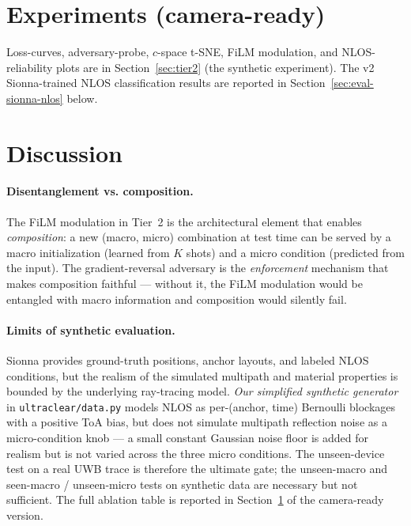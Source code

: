 \documentclass[11pt,letterpaper]{article}
\begin{document}
\section{Experiments (camera-ready)}
\label{sec:experiments}

Loss-curves,
adversary-probe, $c$-space t-SNE, FiLM modulation, and
NLOS-reliability plots are in Section~\ref{sec:tier2} (the
synthetic experiment). The v2 Sionna-trained NLOS
classification results are reported in
Section~\ref{sec:eval-sionna-nlos} below.

\section{Discussion}
\label{sec:discussion}

\paragraph{Disentanglement vs. composition.}
The FiLM modulation in Tier~2 is the architectural element that
enables \emph{composition}: a new (macro, micro) combination at
test time can be served by a macro initialization (learned from
$K$ shots) and a micro condition (predicted from the input). The
gradient-reversal adversary is the \emph{enforcement} mechanism
that makes composition faithful --- without it, the FiLM
modulation would be entangled with macro information and
composition would silently fail.

\paragraph{Limits of synthetic evaluation.}
Sionna provides ground-truth positions, anchor layouts, and
labeled NLOS conditions, but the realism of the simulated
multipath and material properties is bounded by the underlying
ray-tracing model. \emph{Our simplified synthetic generator}
in \texttt{ultraclear/data.py} models NLOS as per-(anchor, time)
Bernoulli blockages with a positive ToA bias, but does not
simulate multipath reflection noise as a micro-condition knob
--- a small constant Gaussian noise floor is added for realism
but is not varied across the three micro conditions. The
unseen-device test on a real UWB trace is therefore the
ultimate gate; the unseen-macro and seen-macro / unseen-micro
tests on synthetic data are necessary but not sufficient. The
full ablation table is reported in Section~\ref{sec:experiments}
of the camera-ready version.
\end{document}
